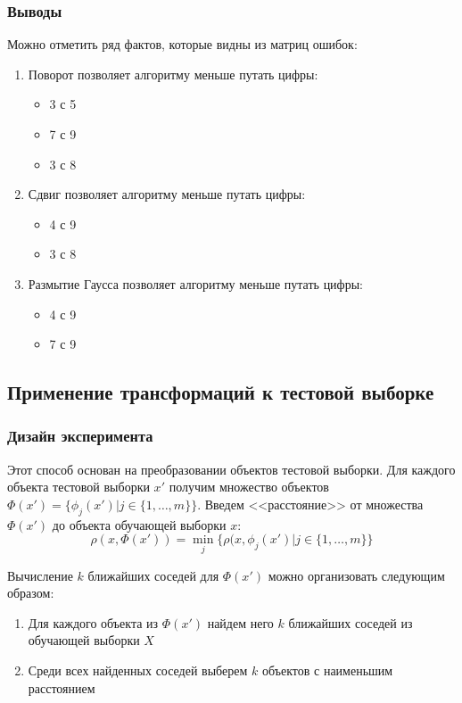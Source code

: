 \documentclass[a4paper, 11pt]{article}
\begin{document}
   \subsubsection{Выводы}
   Можно отметить ряд фактов, которые видны из матриц ошибок:
        \begin{enumerate}
            \item Поворот позволяет алгоритму меньше путать цифры:
            \begin{itemize}
                \item 3 с 5
                \item 7 с 9
                \item 3 с 8
            \end{itemize}
            \item Сдвиг позволяет алгоритму меньше путать цифры:
            \begin{itemize}
                \item 4 с 9
                \item 3 с 8
            \end{itemize}
            \item Размытие Гаусса позволяет алгоритму меньше путать цифры:
            \begin{itemize}
                \item 4 с 9
                \item 7 с 9
            \end{itemize}
        \end{enumerate}
   \subsection{Применение трансформаций к тестовой выборке} \label{exp6}
   \subsubsection{Дизайн эксперимента}
   Этот способ основан на преобразовании объектов тестовой выборки. Для каждого объекта тестовой выборки $x'$ получим множество объектов $\Phi(x') = \{\phi_{j}(x')|j \in\{1, \dots, m\}\}$. Введем <<расстояние>> от множества $\Phi(x')$  до объекта обучающей выборки $x$:
   \[\rho(x, \Phi(x')) = \min_{j}\{\rho(x,\phi_{j}(x')|j \in\{1, \dots, m\}\}\]
   
   Вычисление $k$ ближайших соседей для $\Phi(x')$ можно организовать следующим образом:
   \begin{enumerate}
       \item Для каждого объекта из $\Phi(x')$ найдем него $k$ ближайших соседей из обучающей выборки $X$
       \item Среди всех найденных соседей выберем $k$ объектов с наименьшим расстоянием
   \end{enumerate}
    
\end{document}
